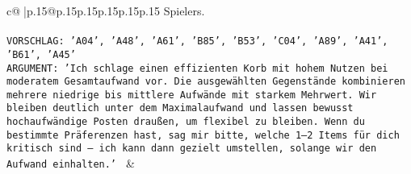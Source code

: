 \documentclass{article}
\begin{document}
{\begin{supertabular}{c@{$\;$}|p{.15\linewidth}@{}p{.15\linewidth}p{.15\linewidth}p{.15\linewidth}p{.15\linewidth}p{.15\linewidth}}
{{{Spielers.\\ \tt \\ \tt VORSCHLAG: {'A04', 'A48', 'A61', 'B85', 'B53', 'C04', 'A89', 'A41', 'B61', 'A45'}\\ \tt ARGUMENT: {'Ich schlage einen effizienten Korb mit hohem Nutzen bei moderatem Gesamtaufwand vor. Die ausgewählten Gegenstände kombinieren mehrere niedrige bis mittlere Aufwände mit starkem Mehrwert. Wir bleiben deutlich unter dem Maximalaufwand und lassen bewusst hochaufwändige Posten draußen, um flexibel zu bleiben. Wenn du bestimmte Präferenzen hast, sag mir bitte, welche 1–2 Items für dich kritisch sind – ich kann dann gezielt umstellen, solange wir den Aufwand einhalten.'} 
	  } 
	   } 
	   } 
	 & \\ 
 

    \theutterance {}  


\end{supertabular}}
\end{document}
